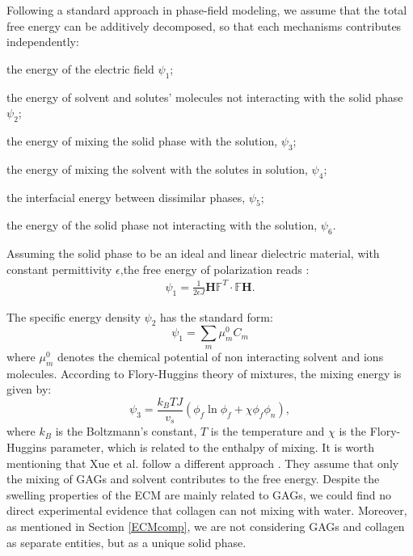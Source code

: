 \documentclass[runningheads]{llncs}
\newcommand{\indentitem}{\setlength\itemindent{20pt}}
\newcommand{\F}{\ensuremath{\mathbb{F}}}
\begin{document}
Following a standard approach in phase-field modeling, we assume that the total free energy can be additively decomposed, so that each mechanisms contributes independently:

\begin{enumerate}
	{\indentitem\item[\textbullet] the energy of the electric field $\psi_1$;}
	{\indentitem \item[\textbullet] the energy of solvent and solutes' molecules not interacting with the solid phase $\psi_2$;}
	{\indentitem\item[\textbullet] the energy of mixing the solid phase with the solution, $\psi_3$;}
	{\indentitem\item[\textbullet] the energy of mixing the solvent with the solutes in solution, $\psi_4$;}
	{\indentitem\item[\textbullet] the interfacial energy between dissimilar phases, $\psi_5$;}
	{\indentitem\item[\textbullet] the energy of the solid phase not interacting with the solution, $\psi_6$.}
\end{enumerate}

Assuming the solid phase to be an ideal and linear dielectric material, with constant permittivity $\epsilon$,the free energy of polarization reads \cite{DROZDOV+,Reviewpolyel}:
\begin{gather}
\psi_1 = \frac{1}{2\epsilon J} \mathbf{H}\F^T \cdot \F \mathbf{H}.
\end{gather}

The specific energy density $\psi_2$ has the standard form:
\begin{equation}
\psi_1 = \sum\limits_{m} \mu^0_m C_m
\end{equation} 
where $\mu^0_m$ denotes the chemical potential of non interacting solvent and ions molecules. According to Flory-Huggins theory \cite{flory,hug} of mixtures, the mixing energy is given by:
\begin{equation}
\psi_3 = \frac{k_B T J}{v_s} \left(\phi_f \ln \phi_f + \chi \phi_f \phi_n\right),
\end{equation}
where $k_B$ is the Boltzmann's constant, $T$ is the temperature and $\chi$ is the Flory-Huggins parameter, which is related to the enthalpy of mixing. It is worth mentioning that Xue et al. follow a different approach \cite{ecm1,ecm2}. They assume that only the mixing of GAGs and solvent contributes to the free energy. Despite the swelling properties of the ECM are mainly related to GAGs, we could find no direct experimental evidence that collagen can not mixing with water. Moreover, as mentioned in Section \ref{ECMcomp}, we are not considering GAGs and collagen as separate entities, but as a unique solid phase.
\end{document}
